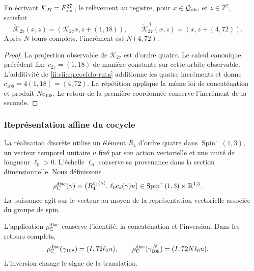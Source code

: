 \begin{proposition}
\label{ii:vii:prop:memoria-vuelta-completa}
En écrivant \(\mathcal K_{27}=F_{\rm obs}^{27}\), le relèvement
au registre, pour \(x\in\mathcal Q_{\rm obs}\) et \(z\in\mathbb Z^2\), satisfait
\[
 \widetilde{\mathcal K}_{27}(x,z)
   =(\mathcal K_{27}x,z+(1,18)),\qquad
 \widetilde{\mathcal K}_{27}^{\,4}(x,z)
   =(x,z+(4,72)).
\]
Après \(N\) tours complets, l'incrément est \(N(4,72)\).
\end{proposition}

\begin{proof}
La projection observable de \(\mathcal K_{27}\) est d'ordre quatre. Le calcul canonique précédent fixe \(c_{27}=(1,18)\) de manière constante sur cette orbite observable. L'additivité de \eqref{ii:vii:eq:cociclo-ruta} additionne les quatre incréments et donne \(c_{108}=4(1,18)=(4,72)\). La répétition applique la même loi de concaténation et produit \(Nc_{108}\). Le retour de la première coordonnée conserve l'incrément de la seconde.
\end{proof}

\subsubsection{Représentation affine du cocycle}
\label{ii:vii:subsec:representacion-afin-cociclo}

La réalisation discrète utilise un élément \(R_4\) d'ordre quatre dans
\(\operatorname{Spin}^+(1,3)\), un vecteur temporel unitaire \(u\)
fixé par son action vectorielle et une unité de longueur \(\ell_0>0\).
L'échelle \(\ell_0\) conserve sa provenance dans la section dimensionnelle.
Nous définissons
\begin{equation}
 \rho_{\rm C}^{\rm disc}(\gamma)=
 \bigl(R_4^{c_g(\gamma)},\,\ell_0c_s(\gamma)u\bigr)
 \in\operatorname{Spin}^+(1,3)\ltimes\mathbb R^{1,3}.
 \label{ii:vii:eq:representacion-discreta-memoria}
\end{equation}
La puissance agit sur le vecteur au moyen de la représentation vectorielle
associée du groupe de spin.

\begin{theorem}
\label{ii:vii:thm:traslacion-memoria}
L'application \(\rho_{\rm C}^{\rm disc}\) conserve l'identité,
la concaténation et l'inversion. Dans les retours complets,
\begin{equation}
 \rho_{\rm C}^{\rm disc}(\gamma_{108})=(I,72\ell_0u),\qquad
 \rho_{\rm C}^{\rm disc}(\gamma_{108}^{\,N})=(I,72N\ell_0u).
 \label{ii:vii:eq:traslacion-retorno-108}
\end{equation}
L'inversion change le signe de la translation.
\end{theorem}

